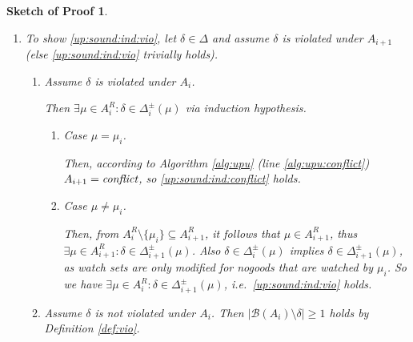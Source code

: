 \documentclass{vutinfth} %
\newtheorem{proof-sketch}{Sketch of Proof}[chapter]
\newcommand{\bass}{\mathcal{B}}
\newcommand{\ass}{A}
\newcommand{\bT}{\mathbf{T}}
\newcommand{\bF}{\mathbf{F}}
\newcommand{\dpm}{\Delta^\pm}
\newcommand{\headf}{H}
\newcommand{\bodyf}{B}
\newcommand{\sgl}{\mu}
\newcommand{\bsgl}{\sigma}
\begin{document}
\begin{proof-sketch}
\begin{enumerate}
\begin{enumerate}
\end{enumerate}

\item To show \ref{up:sound:ind:vio}, let $\delta \in \Delta$ and assume $\delta$ is violated under $A_{i+1}$ (else \ref{up:sound:ind:vio} trivially holds).
\begin{enumerate}
\item Assume $\delta$ is violated under $A_i$.

Then $\exists \sgl \in \ass_i^R : \delta \in \dpm_i(\sgl)$ via induction hypothesis.
\begin{enumerate}
\item Case $\sgl = \sgl_i$.

Then, according to Algorithm \ref{alg:upu} (line \ref{alg:upu:conflict}) $A_{i+1} = \emph{conflict}$, so \ref{up:sound:ind:conflict} holds.

\item Case $\sgl \not = \sgl_i$.

Then, from $\ass_{i}^R \setminus \{ \sgl_i \} \subseteq \ass_{i+1}^R$, it follows that $\sgl \in \ass_{i+1}^R$, thus $\exists \sgl \in \ass_{i+1}^R : \delta \in \dpm_{i+1}(\sgl)$. Also $\delta \in \dpm_i(\sgl)$ implies $\delta \in \dpm_{i+1}(\sgl)$, as watch sets are only modified for nogoods that are watched by $\sgl_i$. So we have $\exists \sgl \in \ass_i^R : \delta \in \dpm_{i+1}(\sgl)$, i.e.~\ref{up:sound:ind:vio} holds.
\end{enumerate}
\item Assume $\delta$ is not violated under $A_i$. Then $|\bass(A_i) \setminus \delta| \geq 1$  holds by Definition \ref{def:vio}.


\end{enumerate}
\end{enumerate}
\end{proof-sketch}
\end{document}
